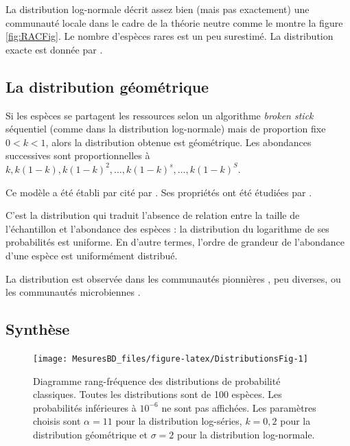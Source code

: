 \documentclass[
  11pt,
  french,
  a4paper,
  extrafontsizes,onecolumn,openright
  ]{memoir}
\begin{document}
La distribution log-normale décrit assez bien (mais pas exactement) une communauté locale dans le cadre de la théorie neutre \autocite{Hubbell2001} comme le montre la figure \ref{fig:RACFig}.
Le nombre d'espèces rares est un peu surestimé.
La distribution exacte est donnée par \textcite{Volkov2003}.

\subsection{La distribution géométrique}\label{la-distribution-guxe9omuxe9trique}

Si les espèces se partagent les ressources selon un algorithme \emph{broken stick} séquentiel (comme dans la distribution log-normale) mais de proportion fixe \(0<k<1\), alors la distribution obtenue est géométrique.
Les abondances successives sont proportionnelles à \(k, k(1-k), k(1-k)^2, \dots, k(1-k)^s, \dots, k(1-k)^S\).

Ce modèle a été établi par \textcite{Motomura1932} cité par \textcite{May1975}.
Ses propriétés ont été étudiées par \textcite{Whittaker1972}.

C'est la distribution qui traduit l'absence de relation entre la taille de l'échantillon et l'abondance des espèces \autocite{Pueyo2007}: la distribution du logarithme de ses probabilités est uniforme.
En d'autre termes, l'ordre de grandeur de l'abondance d'une espèce est uniformément distribué.

La distribution est observée dans les communautés pionnières \autocite{Bazzaz1975}, peu diverses, ou les communautés microbiennes \autocite{Haegeman2013}.

\subsection{Synthèse}\label{synthuxe8se}



\scriptsize

\begin{figure}

{\centering \texttt{[image: MesuresBD\_files/figure-latex/DistributionsFig-1]} 

}

\caption{Diagramme rang-fréquence des distributions de probabilité classiques. Toutes les distributions sont de 100 espèces. Les probabilités inférieures à \(10^{-6}\) ne sont pas affichées. Les paramètres choisis sont \(\alpha=11\) pour la distribution log-séries, \(k=0,2\) pour la distribution géométrique et \(\sigma=2\) pour la distribution log-normale.}\label{fig:DistributionsFig}
\end{figure}
\end{document}
